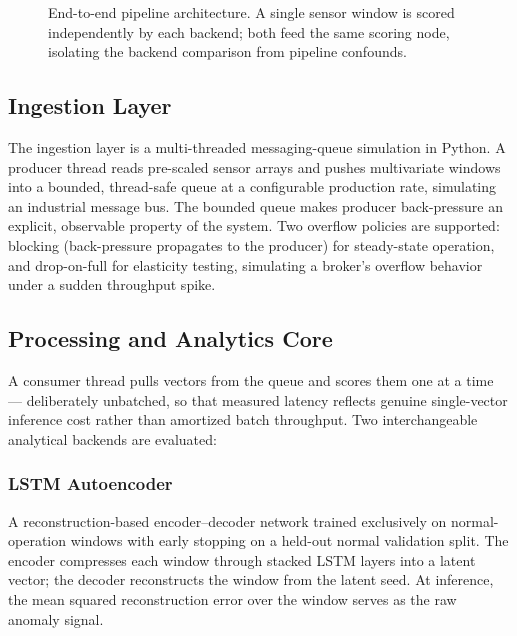 \begin{figure}[!t]
\centering
{}
\caption{End-to-end pipeline architecture. A single sensor window is scored
independently by each backend; both feed the same scoring node, isolating
the backend comparison from pipeline confounds.}
\label{fig:architecture}
\end{figure}

\subsection{Ingestion Layer}
The ingestion layer is a multi-threaded messaging-queue simulation in
Python. A producer thread reads pre-scaled sensor arrays and pushes
multivariate windows into a bounded, thread-safe queue at a configurable
production rate, simulating an industrial message bus. The bounded queue
makes producer back-pressure an explicit, observable property of the
system. Two overflow policies are supported: blocking (back-pressure
propagates to the producer) for steady-state operation, and
drop-on-full for elasticity testing, simulating a broker's overflow
behavior under a sudden throughput spike.

\subsection{Processing and Analytics Core}
A consumer thread pulls vectors from the queue and scores them one at a
time --- deliberately unbatched, so that measured latency reflects genuine
single-vector inference cost rather than amortized batch throughput. Two
interchangeable analytical backends are evaluated:

\subsubsection{LSTM Autoencoder}
A reconstruction-based encoder--decoder network trained exclusively on
normal-operation windows with early stopping on a held-out normal
validation split. The encoder compresses each window through stacked LSTM
layers into a latent vector; the decoder reconstructs the window from the
latent seed. At inference, the mean squared reconstruction error over the
window serves as the raw anomaly signal.

